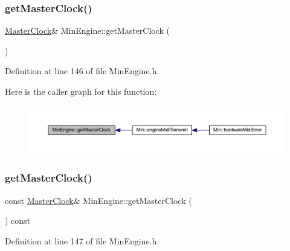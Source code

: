 \subsubsection{\texorpdfstring{get\+Master\+Clock()}{getMasterClock()}\hspace{0.1cm}{\footnotesize\ttfamily [1/2]}}
{\footnotesize\ttfamily \hyperlink{class_master_clock}{Master\+Clock}\& Min\+Engine\+::get\+Master\+Clock (\begin{DoxyParamCaption}{ }\end{DoxyParamCaption})\hspace{0.3cm}{\ttfamily [inline]}}



Definition at line 146 of file Min\+Engine.\+h.

Here is the caller graph for this function\+:
\nopagebreak
\begin{figure}[H]
\begin{center}
\leavevmode
\includegraphics[width=350pt]{class_min_engine_a4d41a91ebf44df8b8d6912293a3a3452_icgraph}
\end{center}
\end{figure}
\mbox{\label{class_min_engine_a1f5e35caaf19b4a4319a5ce26dfc34b3}} 
\subsubsection{\texorpdfstring{get\+Master\+Clock()}{getMasterClock()}\hspace{0.1cm}{\footnotesize\ttfamily [2/2]}}
{\footnotesize\ttfamily const \hyperlink{class_master_clock}{Master\+Clock}\& Min\+Engine\+::get\+Master\+Clock (\begin{DoxyParamCaption}{ }\end{DoxyParamCaption}) const\hspace{0.3cm}{\ttfamily [inline]}}



Definition at line 147 of file Min\+Engine.\+h.

\mbox{\label{class_min_engine_ab6c3bb750ae223f9b31b94bb2f21f082}} 
